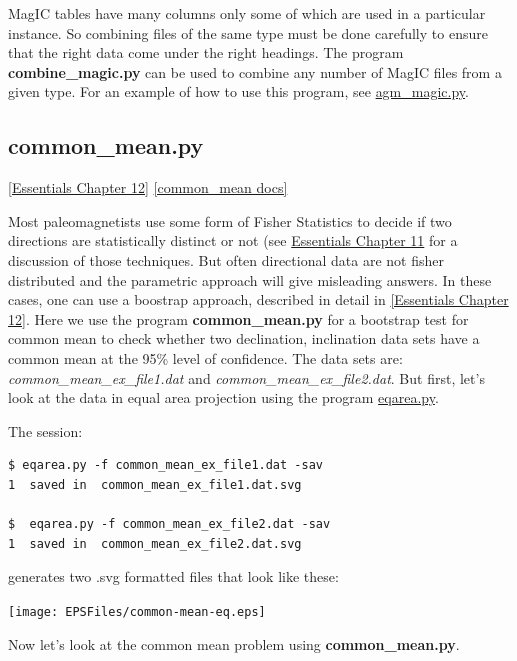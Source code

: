 \documentclass[11pt]{book}
\begin{document}
{{{MagIC tables have many columns only some of which are used in a particular instance.  So combining files of the same type must be done carefully to ensure that the right data come under the right headings.  The program {\bf combine\_magic.py} can be used to combine any number of MagIC files from a given type.    For an example of how to use this program, see \href{#agm_magic.py}{agm\_magic.py}.





\subsection{common\_mean.py}
\href{http://earthref.org/MAGIC/books/Tauxe/Essentials/WebBook3ch12.html#ch12}{[Essentials Chapter 12]}
\href{https://github.com/PmagPy/PmagPy/blob/master/programs/common_mean.py}{[common\_mean docs]}

Most paleomagnetists use some form of Fisher Statistics to decide if two directions are statistically distinct or not (see \href{http://earthref.org/MAGIC/books/Tauxe/Essentials/WebBook3ch11.html#ch11}{Essentials Chapter 11} for a discussion of those techniques.  But often directional data are not fisher distributed and the parametric approach will give misleading answers.  In these cases, one can use a boostrap approach, described in detail in \href{http://earthref.org/MAGIC/books/Tauxe/Essentials/WebBook3ch12.html#ch12}{[Essentials Chapter 12]}.  Here we
use the program {\bf common\_mean.py} for a bootstrap test for common mean to check whether two declination, inclination data sets have a common mean at the 95\% level of confidence.    The data sets are: {\it common\_mean\_ex\_file1.dat } and {\it common\_mean\_ex\_file2.dat}.  But first, let's look at the data in equal area projection  using the program \href{#eqarea.py}{eqarea.py}.

The session:
\begin{verbatim}
$ eqarea.py -f common_mean_ex_file1.dat -sav
1  saved in  common_mean_ex_file1.dat.svg

$  eqarea.py -f common_mean_ex_file2.dat -sav
1  saved in  common_mean_ex_file2.dat.svg
\end{verbatim}

\noindent generates two .svg formatted files that look like these:


  \texttt{[image: EPSFiles/common-mean-eq.eps]}

Now let's look at the common mean problem using {\bf common\_mean.py}.

}}}
\end{document}
